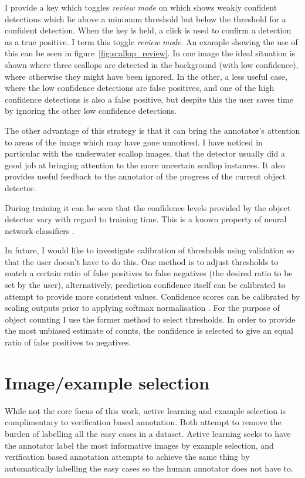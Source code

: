 I provide a key which toggles \emph{review mode} on which shows weakly confident detections which lie above a minimum threshold but below the threshold for a confident detection. When the key is held, a click is used to confirm a detection as a true positive. I term this toggle \emph{review mode}.  An example showing the use of this can be seen in figure~\ref{fig:scallop_review}. In one image the ideal situation is shown where three scallops are detected in the background (with low confidence), where otherwise they might have been ignored. In the other, a less useful case, where the low confidence detections are false positives, and one of the high confidence detections is also a false positive, but despite this the user saves time by ignoring the other low confidence detections.

The other advantage of this strategy is that it can bring the annotator's attention to areas of the image which may have gone unnoticed. I have noticed in particular with the underwater scallop images, that the detector usually did a good job at bringing attention to the more uncertain scallop instances. It also provides useful feedback to the annotator of the progress of the current object detector. 

During training it can be seen that the confidence levels provided by the object detector vary with regard to training time. This is a known property of neural network classifiers \cite{Guo2017}.

In future, I would like to investigate calibration of thresholds using validation so that the user doesn't have to do this. One method is to adjust thresholds to match a certain ratio of false positives to false negatives (the desired ratio to be set by the user), alternatively, prediction confidence itself can be calibrated to attempt to provide more consistent values. Confidence scores can be calibrated by scaling outputs prior to applying softmax normalisation \cite{Guo2017}. For the purpose of object counting I use the former method to select thresholds. In order to provide the most unbiased estimate of counts, the confidence is selected to give an equal ratio of false positives to negatives.
 
\section{Image/example selection}
\label{sec:example_selection}

While not the core focus of this work, active learning and example selection is complimentary to verification based annotation. Both attempt to remove the burden of labelling all the easy cases in a dataset. Active learning seeks to have the annotator label the most informative images by example selection, and verification based annotation attempts to achieve the same thing by automatically labelling the easy cases so the human annotator does not have to. 

